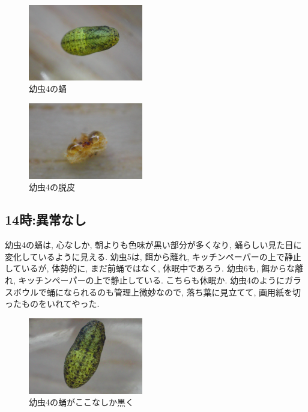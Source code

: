 \documentclass{jsarticle}
\begin{document}
\begin{figure}[htbp]
  \begin{center}
    \includegraphics[width=5cm]{photo6/Larva4-pupa1.JPG}
  \end{center}
  \caption{幼虫4の蛹}
\end{figure}

\begin{figure}[htbp]
  \begin{center}
    \includegraphics[width=5cm]{photo6/Larva4-oldSkin.JPG}
  \end{center}
  \caption{幼虫4の脱皮}
\end{figure}

\subsection{14時:異常なし}
幼虫4の蛹は, 心なしか, 朝よりも色味が黒い部分が多くなり, 蛹らしい見た目に変化しているように見える. 
幼虫5は, 餌から離れ, キッチンペーパーの上で静止しているが, 体勢的に, まだ前蛹ではなく, 休眠中であろう. 
幼虫6も, 餌からな離れ, キッチンペーパーの上で静止している. こちらも休眠か. 
幼虫4のようにガラスボウルで蛹になられるのも管理上微妙なので, 落ち葉に見立てて, 画用紙を切ったものをいれてやった. 

\begin{figure}[htbp]
  \begin{center}
    \includegraphics[width=5cm]{photo6/Larva4-pupa2.JPG}
  \end{center}
  \caption{幼虫4の蛹がここなしか黒く}
\end{figure}
\end{document}
